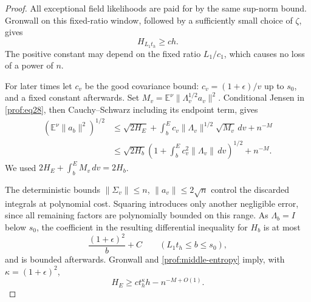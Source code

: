 \begin{proof}
All exceptional field likelihoods are paid for by the same sup-norm bound.
Gronwall on this fixed-ratio window, followed by a sufficiently small
choice of $\zeta$, gives
\begin{equation}
 H_{L_1t_h}\ge c h.
 \label{prof:middle-entropy}
\end{equation}
The positive constant may depend on the fixed ratio $L_1/c_1$, which causes
no loss of a power of $n$.

For later times let $c_v$ be the good covariance bound:
$c_v=(1+\epsilon)/v$ up to $s_0$, and a fixed constant afterwards.  Set
$M_v=\mathbb E^\nu\|\Lambda_v^{1/2}a_v\|^2$.  Conditional Jensen in
\eqref{prof:eq28}, then Cauchy--Schwarz including its endpoint term, gives
\begin{equation}
 \begin{split}
 (\mathbb E^\nu\|a_b\|^2)^{1/2}
 &\le \sqrt{2H_E}
       +\int_b^E c_v\|\Lambda_v\|^{1/2}\sqrt{M_v}\,dv+n^{-M}\\
 &\le \sqrt{2H_b}
       \left(1+\int_b^E c_v^2\|\Lambda_v\|\,dv\right)^{1/2}
       +n^{-M}.
 \end{split}
 \label{prof:backward-entropy}
\end{equation}
We used $2H_E+\int_b^E M_v\,dv=2H_b$.

The deterministic bounds
$\|\Sigma_v\|\le n$, $\|a_v\|\le2\sqrt n$ control the discarded
integrals at polynomial cost.  Squaring introduces only another negligible
error, since all remaining factors are polynomially bounded on this range.
As $\Lambda_b=I$ below $s_0$, the coefficient in the resulting differential
inequality for $H_b$ is at most
\[
 \frac{(1+\epsilon)^2}{b}+C\qquad(L_1t_h\le b\le s_0),
\]
and is bounded afterwards.  Gronwall and \eqref{prof:middle-entropy} imply,
with $\kappa=(1+\epsilon)^2$,
\begin{equation}
 H_E\ge c t_h^\kappa h-n^{-M+O(1)}.
 \label{prof:entropy-at-product}
\end{equation}


\end{proof}

